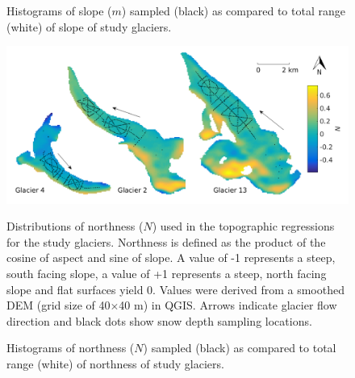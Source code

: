 \documentclass{sfuthesis}
\newcommand{\topomap}{Arrows indicate glacier flow direction and black dots show snow depth sampling locations. }
\begin{document}
\begin{figure}[H]
	\caption{Histograms of slope ($m$) sampled (black) as compared to total range (white) of slope of study glaciers.}
	\label{sampledRange:slope}
\end{figure}

\begin{figure}[H]
	\centering
	\includegraphics[width=\textwidth]{Map_northness.png}\\
	\caption{Distributions of northness ($N$) used in the topographic regressions for the study glaciers. Northness is defined as the product of the cosine of aspect and sine of slope. A value of -1 represents a steep, south facing slope, a value of +1 represents a steep, north facing slope and flat surfaces yield 0. Values were derived from a smoothed DEM (grid size of 40$\times$40 m) in QGIS. \topomap}
	\label{map:northness}
\end{figure}

\begin{figure}[H]
	\caption{Histograms of northness ($N$) sampled (black) as compared to total range (white) of northness of study glaciers.}
	\label{sampledRange:northness}
\end{figure}
\end{document}
